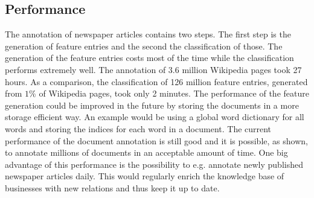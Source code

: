 \subsection*{Performance}
The annotation of newspaper articles contains two steps. The first step is the generation of feature entries and the second the classification of those. The generation of the feature entries costs most of the time while the classification performs extremely well. The annotation of 3.6 million Wikipedia pages took 27 hours. As a comparison, the classification of 126 million feature entries, generated from $1\%$ of Wikipedia pages, took only 2 minutes. The performance of the feature generation could be improved in the future by storing the documents in a more storage efficient way. An example would be using a global word dictionary for all words and storing the indices for each word in a document. The current performance of the document annotation is still good and it is possible, as shown, to annotate millions of documents in an acceptable amount of time. One big advantage of this performance is the possibility to e.g. annotate newly published newspaper articles daily. This would regularly enrich the knowledge base of businesses with new relations and thus keep it up to date.\par

